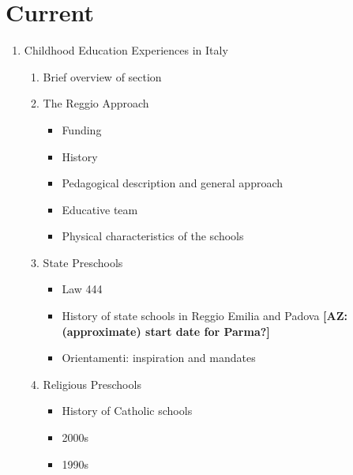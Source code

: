 \documentclass{article}
\begin{document}
\section{Current}

\begin{enumerate}
	\item Childhood Education Experiences in Italy

		\begin{enumerate}
		\item Brief overview of section

		\item The Reggio Approach
			\begin{itemize}
			\item Funding
			\item History
			\item Pedagogical description and general approach
			\item Educative team
			\item Physical characteristics of the schools
			\end{itemize}

		\item State Preschools
			\begin{itemize}
			\item Law 444
			\item History of state schools in Reggio Emilia and Padova \textbf{[AZ: (approximate) start date for Parma?]}
			\item Orientamenti: inspiration and mandates
			\end{itemize}

		\item Religious Preschools
			\begin{itemize}
			\item History of Catholic schools
			\item 2000s
			\item 1990s
			\end{itemize}
		\end{enumerate}


\end{enumerate}
\end{document}
